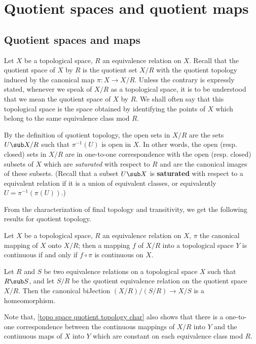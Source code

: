 \section{Quotient spaces and quotient maps}
\subsection{Quotient spaces and maps}
Let $X$ be a topological space, $R$ an equivalence relation on $X$. Recall that the quotient space of $X$ by $R$ is the quotient set $X/R$ with the quotient topology induced by the canonical map $\pi:X\to X/R$. Unless the contrary is expressly stated, whenever we speak of $X/R$ as a topological space, it is to be understood that we mean the quotient space of $X$ by $R$. We shall often say that this topological space is the space obtained by identifying the points of $X$ which belong to the same equivalence class mod $R$.\par
By the definition of quotient topology, the open sets in $X/R$ are the sets $U\sub X/R$ such that $\pi^{-1}(U)$ is open in $X$. In other words, the open (resp. closed) sets in $X/R$ are in one-to-one correspondence with the open (resp. closed) subsets of $X$ which are \textit{saturated} with respect to $R$ and are the canonical images of these subsets. (Recall that a subset $U\sub X$ is \textbf{saturated} with respect to a equivalent relation if it is a union of equivalent classes, or equivalently $U=\pi^{-1}(\pi(U))$.)\par
From the characterization of final topology and transitivity, we get the following results for quotient topology.
\begin{proposition}\label{topo space quotient topology char}
Let $X$ be a topological space, $R$ an equivalence relation on $X$, $\pi$ the canonical mapping of $X$ onto $X/R$; then a mapping $f$ of $X/R$ into a topological space $Y$ is continuous if and only if $f\circ\pi$ is continuous on $X$.
\end{proposition}
\begin{proposition}\label{topo space quotient topology transitivity}
Let $R$ and $S$ be two equivalence relations on a topological space $X$ such that $R\sub S$, and let $S/R$ be the quotient equivalence relation on the quotient space $X/R$. Then the canonical biJection $(X/R)/(S/R)\to X/S$ is a homeomorphism.
\end{proposition}
Note that, \cref{topo space quotient topology char} also shows that there is a one-to-one correspondence between the continuous mappings of $X/R$ into $Y$ and the continuous maps of $X$ into $Y$ which are constant on each equivalence class mod $R$.
